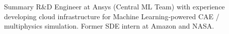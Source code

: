 \begin{rSection}{Summary}
R\&D Engineer at Ansys (Central ML Team) with experience developing cloud infrastructure for Machine Learning-powered CAE / multiphysics simulation. Former SDE intern at Amazon and NASA.
\end{rSection}
